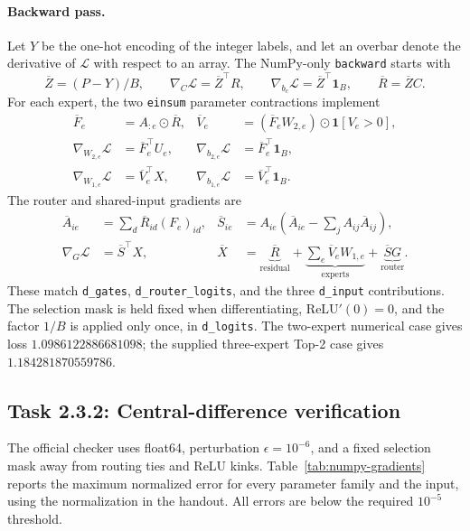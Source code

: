 \paragraph{Backward pass.}
Let $Y$ be the one-hot encoding of the integer labels, and let an overbar denote
the derivative of $\mathcal L$ with respect to an array. The NumPy-only
\texttt{backward} starts with
\begin{equation}
\overline Z=(P-Y)/B,\qquad
\nabla_C\mathcal L=\overline Z^{\top}R,\qquad
\nabla_{b_c}\mathcal L=\overline Z^{\top}\mathbf1_B,\qquad
\overline R=\overline ZC.
\end{equation}
For each expert, the two \texttt{einsum} parameter contractions implement
\begin{align}
\overline F_e&=A_{:e}\odot\overline R,&
\overline V_e&=(\overline F_eW_{2,e})\odot\mathbf1[V_e>0],\\
\nabla_{W_{2,e}}\mathcal L&=\overline F_e^{\top}U_e,&
\nabla_{b_{2,e}}\mathcal L&=\overline F_e^{\top}\mathbf1_B,\\
\nabla_{W_{1,e}}\mathcal L&=\overline V_e^{\top}X,&
\nabla_{b_{1,e}}\mathcal L&=\overline V_e^{\top}\mathbf1_B.
\end{align}
The router and shared-input gradients are
\begin{align}
\overline A_{ie}&=\sum_d\overline R_{id}(F_e)_{id},&
\overline S_{ie}&=A_{ie}\left(\overline A_{ie}-\sum_j A_{ij}\overline A_{ij}\right),\\
\nabla_G\mathcal L&=\overline S^{\top}X,&
\overline X&=\underbrace{\overline R}_{\text{residual}}
+\underbrace{\sum_e\overline V_eW_{1,e}}_{\text{experts}}
+\underbrace{\overline SG}_{\text{router}}.
\end{align}
These match \texttt{d\_gates}, \texttt{d\_router\_logits}, and the three
\texttt{d\_input} contributions. The selection mask is held fixed when
differentiating, $\mathrm{ReLU}'(0)=0$, and the factor $1/B$ is applied only
once, in \texttt{d\_logits}. The two-expert numerical case gives loss
$1.0986122886681098$; the supplied three-expert Top-2 case gives
$1.184281870559786$.

\subsection{Task 2.3.2: Central-difference verification}
The official checker uses float64, perturbation $\epsilon=10^{-6}$, and a fixed selection mask away from routing ties and ReLU kinks. Table~\ref{tab:numpy-gradients} reports the maximum normalized error for every parameter family and the input, using the normalization in the handout. All errors are below the required $10^{-5}$ threshold.


